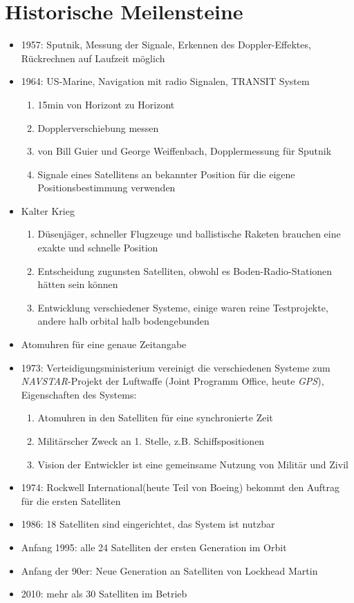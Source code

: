 \section{Historische Meilensteine}
\label{sec:historische-meilensteine}

\begin{itemize}
  \item 1957: Sputnik, Messung der Signale, Erkennen des Doppler-Effektes, Rückrechnen auf Laufzeit möglich
  \item 1964: US-Marine, Navigation mit radio Signalen, TRANSIT System
  \begin{enumerate}
      \item 15min von Horizont zu Horizont
      \item Dopplerverschiebung messen
      \item von Bill Guier und George Weiffenbach, Dopplermessung für Sputnik
      \item Signale eines Satellitens an bekannter Position für die eigene Positionsbestimmung verwenden
  \end{enumerate}
  \item Kalter Krieg
  \begin{enumerate}
      \item Düsenjäger, schneller Flugzeuge und ballistische Raketen brauchen eine exakte und schnelle Position
      \item Entscheidung zugunsten Satelliten, obwohl es Boden-Radio-Stationen hätten sein können
      \item Entwicklung verschiedener Systeme, einige waren reine Testprojekte, andere halb orbital halb bodengebunden
  \end{enumerate}
   \item Atomuhren für eine genaue Zeitangabe
   \item 1973: Verteidigungsministerium vereinigt die verschiedenen Systeme zum \\\textit{NAVSTAR}-Projekt der Luftwaffe (Joint Programm Office, heute \textit{GPS}),\\Eigenschaften des Systems:
   \begin{enumerate}
       \item Atomuhren in den Satelliten für eine synchronierte Zeit
       \item Militärscher Zweck an 1. Stelle, z.B. Schiffspositionen
       \item Vision der Entwickler ist eine gemeinsame Nutzung von Militär und Zivil
   \end{enumerate}
   \item 1974: Rockwell International(heute Teil von Boeing) bekommt den Auftrag für die ersten Satelliten
   \item 1986: 18 Satelliten sind eingerichtet, das System ist nutzbar
   \item Anfang 1995: alle 24 Satelliten der ersten Generation im Orbit
   \item Anfang der 90er: Neue Generation an Satelliten von Lockhead Martin
   \item 2010: mehr als 30 Satelliten im Betrieb
\end{itemize}
